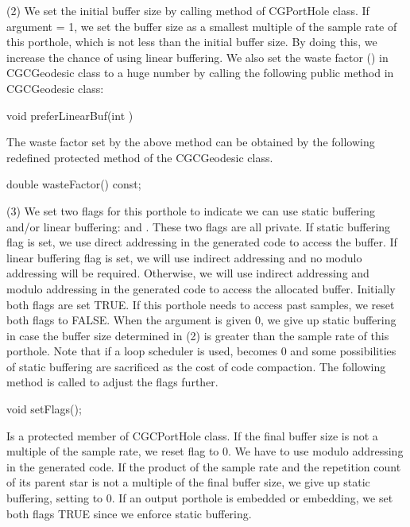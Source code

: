 {(2) We set the initial buffer size by calling  method
of CGPortHole class. If argument  = 1, we set the buffer
size as a smallest multiple of the sample rate of this porthole, which is
not less than the initial buffer size. By doing this, we increase the chance
of using linear buffering. We also set the waste factor 
() in CGCGeodesic
class to a huge number by calling the following public method in CGCGeodesic
class:

\begin{example}
void preferLinearBuf(int )
\end{example}

The waste factor set by the above method can be obtained by the following
redefined protected method of the CGCGeodesic class.

\begin{example}
double wasteFactor() const;
\end{example}

(3) We set two flags for this porthole to indicate we can use static buffering
and/or linear buffering:  and . These two
flags are all private. If static buffering flag is set, we use direct
addressing in the generated code to access the buffer. If linear
buffering flag is set, we will use indirect addressing and no modulo addressing
will be required. Otherwise, we will use indirect addressing and modulo
addressing in the generated code to access the allocated buffer.
Initially both flags are set TRUE. If this porthole needs to access past
samples, we reset both flags to FALSE. When the argument  is
given 0, we give up static buffering in case the buffer size determined
in (2) is greater than the sample rate of this porthole. Note that
if a loop scheduler is used,  becomes 0 and some
possibilities of static buffering are sacrificed as the cost of
code compaction. The following method is called to adjust the flags further.

\begin{example}
void setFlags();
\end{example}

Is a protected member of CGCPortHole class. If the final buffer size is
not a multiple of the sample rate, we reset  flag to 0.
We have to use modulo addressing in the generated code. If the
product of the sample rate and the repetition count of its parent star is
not a multiple of the final buffer size, we give up static buffering, setting
 to 0. If an output porthole is embedded or embedding,
we set both flags TRUE since we enforce static buffering.

}
